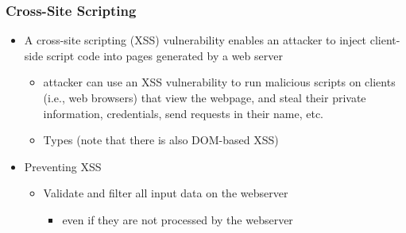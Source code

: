 \documentclass[final]{article}
\begin{document}
\subsubsection*{Cross-Site Scripting}
\begin{itemize}[nosep]
    \item A cross-site scripting (XSS) vulnerability enables an attacker to inject client-side script code into pages generated by a web server
          \begin{itemize}[nosep]
              \item attacker can use an XSS vulnerability to run malicious scripts on clients (i.e., web browsers) that view the webpage, and steal their private information, credentials, send requests in their name, etc.
              \item Types (note that there is also DOM-based XSS)
          \end{itemize}
    \item Preventing XSS
          \begin{itemize}[nosep]
              \item Validate and filter all input data on the webserver
                    \begin{itemize}[nosep]
                        \item even if they are not processed by the webserver

\end{itemize}
\end{itemize}
\end{itemize}
\end{document}
